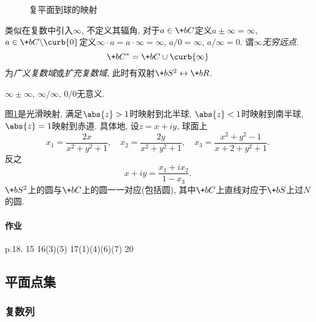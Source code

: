 \documentclass{ctexart}
\begin{document}

\begin{figure}[ht]
    \centering
    \caption{复平面到球的映射}
    \label{fig:复平面到球的映射}
\end{figure}
类似在复数中引入$\infty$, 不定义其辐角, 对于$a\in \+bC$定义$a\pm\infty = \infty$, $a\in \+bC\backslash \curb{0}$定义$\infty\cdot a = a\cdot \infty = \infty$, $a/0 = \infty$, $a/\infty = 0$. 谓$\infty$\emph{无穷远点}.
\[ \+bC^* = \+bC\cup\curb{\infty} \]
为\emph{广义复数域}或\emph{扩充复数域}, 此时有双射$\+bS^2\leftrightarrow \+bR$.
\begin{pitfall}
    $\infty\pm \infty$, $\infty/\infty$, $0/0$无意义.
\end{pitfall}
图\cref{fig:复平面到球的映射}是光滑映射, 满足$\abs{z}>1$时映射到北半球, $\abs{z}<1$时映射到南半球, $\abs{z}=1$映射到赤道. 具体地, 设$z=x+iy$, 球面上
\[ x_1 = \frac{2x}{x^2+y^2+1},\quad x_2 = \frac{2y}{x^2+y^2+1},\quad x_3 = \frac{x^2+y^2-1}{x+2+y^2+1}. \]
反之
\[ x + iy = \frac{x_1 + ix_2}{1-x_3}. \]
$\+bS^2$上的圆与$\+bC$上的圆一一对应(包括圆), 其中$\+bC$上直线对应于$\+bS$上过$N$的圆.

\paragraph{作业} %
\label{par:作业}

p.18. 15 16(3)(5) 17(1)(4)(6)(7) 20




\subsection{平面点集} %
\label{sub:平面点集}

\subsubsection{复数列} %
\label{ssub:复数列}
\end{document}
